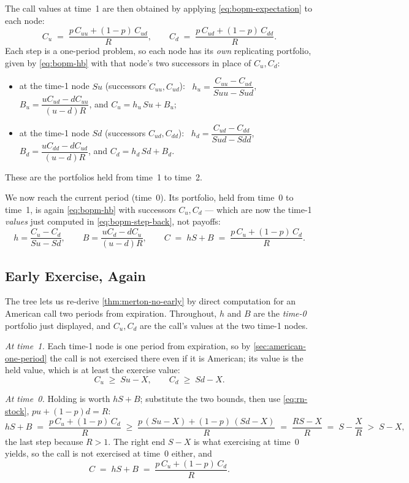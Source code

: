 The call values at time~1 are then obtained by applying \eqref{eq:bopm-expectation} to each node:
\begin{equation}
	C_{u} \;=\; \frac{p\,C_{uu}+(1-p)\,C_{ud}}{R} ,
	\qquad
	C_{d} \;=\; \frac{p\,C_{ud}+(1-p)\,C_{dd}}{R} .
	\label{eq:bopm-step-back}
\end{equation}
Each step is a one-period problem, so each node has its \emph{own} replicating portfolio, given by \eqref{eq:bopm-hb} with that node's two successors in place of $C_{u},C_{d}$:
\begin{itemize}[itemsep=0.3em]
	\item at the time-1 node $Su$ (successors $C_{uu},C_{ud}$): \ $h_{u}=\dfrac{C_{uu}-C_{ud}}{Suu-Sud}$, \ $B_{u}=\dfrac{uC_{ud}-dC_{uu}}{(u-d)R}$, and $C_{u}=h_{u}\,Su+B_{u}$;
	\item at the time-1 node $Sd$ (successors $C_{ud},C_{dd}$): \ $h_{d}=\dfrac{C_{ud}-C_{dd}}{Sud-Sdd}$, \ $B_{d}=\dfrac{uC_{dd}-dC_{ud}}{(u-d)R}$, and $C_{d}=h_{d}\,Sd+B_{d}$.
\end{itemize}
\suppstart
These are the portfolios held from time~1 to time~2.
\suppend

We now reach the current period (time~0).
Its portfolio, held from time~0 to time~1, is again \eqref{eq:bopm-hb} with successors $C_{u},C_{d}$ --- which are now the time-1 \emph{values} just computed in \eqref{eq:bopm-step-back}, not payoffs:
\[
	h=\frac{C_{u}-C_{d}}{Su-Sd} , \qquad
	B=\frac{uC_{d}-dC_{u}}{(u-d)R} , \qquad
	C \;=\; hS+B \;=\; \frac{p\,C_{u}+(1-p)\,C_{d}}{R} .
\]

\subsection{Early Exercise, Again}


\suppstart
The tree lets us re-derive \autoref{thm:merton-no-early} by direct computation for an American call two periods from expiration.
Throughout, $h$ and $B$ are the \emph{time-0} portfolio just displayed, and $C_{u},C_{d}$ are the call's values at the two time-1 nodes.
\suppend

\emph{At time~1.} Each time-1 node is one period from expiration, so by \autoref{sec:american-one-period} the call is not exercised there even if it is American; its value is the held value, which is at least the exercise value:
\[
	C_{u}\;\ge\; Su-X , \qquad C_{d}\;\ge\; Sd-X .
\]

\emph{At time~0.} Holding is worth $hS+B$; substitute the two bounds, then use \eqref{eq:rn-stock}, $pu+(1-p)d=R$:
\[
	hS+B \;=\; \frac{p\,C_{u}+(1-p)\,C_{d}}{R}
	\;\ge\; \frac{p\,(Su-X)+(1-p)\,(Sd-X)}{R}
	\;=\; \frac{RS-X}{R}
	\;=\; S-\frac{X}{R}
	\;>\; S-X ,
\]
the last step because $R>1$.
The right end $S-X$ is what exercising at time~0 yields, so the call is not exercised at time~0 either, and
\[
	C \;=\; hS+B \;=\; \frac{p\,C_{u}+(1-p)\,C_{d}}{R} .
\]

